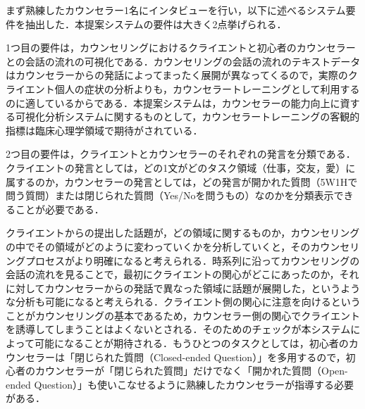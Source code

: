 \documentclass[shuuron]{kuee}
\begin{document}
まず熟練したカウンセラー1名にインタビューを行い，以下に述べるシステム要件を抽出した．本提案システムの要件は大きく2点挙げられる．

1つ目の要件は，カウンセリングにおけるクライエントと初心者のカウンセラーとの会話の流れの可視化である．カウンセリングの会話の流れのテキストデータはカウンセラーからの発話によってまったく展開が異なってくるので，実際のクライエント個人の症状の分析よりも，カウンセラートレーニングとして利用するのに適しているからである．本提案システムは，カウンセラーの能力向上に資する可視化分析システムに関するものとして，カウンセラートレーニングの客観的指標は臨床心理学領域で期待がされている．

2つ目の要件は，クライエントとカウンセラーのそれぞれの発言を分類である．クライエントの発言としては，どの1文がどのタスク領域（仕事，交友，愛）に属するのか，カウンセラーの発言としては，どの発言が開かれた質問（5W1Hで問う質問）または閉じられた質問（Yes/Noを問うもの）なのかを分類表示できることが必要である．

クライエントからの提出した話題が，どの領域に関するものか，カウンセリングの中でその領域がどのように変わっていくかを分析していくと，そのカウンセリングプロセスがより明確になると考えられる．時系列に沿ってカウンセリングの会話の流れを見ることで，最初にクライエントの関心がどこにあったのか，それに対してカウンセラーからの発話で異なった領域に話題が展開した，というような分析も可能になると考えられる．クライエント側の関心に注意を向けるということがカウンセリングの基本であるため，カウンセラー側の関心でクライエントを誘導してしまうことはよくないとされる．そのためのチェックが本システムによって可能になることが期待される．もうひとつのタスクとしては，初心者のカウンセラーは「閉じられた質問（Closed-ended Question）」を多用するので，初心者のカウンセラーが「閉じられた質問」だけでなく「開かれた質問（Open-ended Question）」も使いこなせるように熟練したカウンセラーが指導する必要がある．%



%
\end{document}
